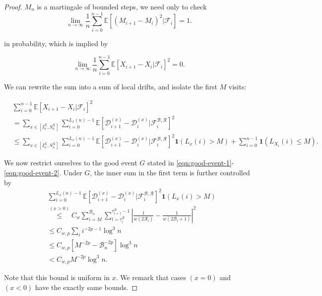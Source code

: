 \begin{proof}
 $M_n$ is a martingale of bounded steps, we need only to check
 \[
	 \lim_{n \to \infty } \frac{1}{n} \sum_{i = 0}^{n-1} \mathbb{E}\left[ (M_{i+1} - M_i)^2 | \mathcal{F}_i \right]  = 1
 .\] 

in probability, which is implied by

\[
	 \lim_{n \to \infty } \frac{1}{n} \sum_{i = 0}^{n-1} \mathbb{E}\left[ X_{i+1} - X_i | \mathcal{F}_i \right]^2 = 0
.\] 

We can rewrite the sum into a sum of local drifts, and isolate the first $M$ visits:

\begin{align}
	&\sum_{i = 0}^{n-1} \mathbb{E}\left[ X_{i+1} - X_i | \mathcal{F}_i \right]^2\\
	&= \sum_{x \in \left[ I_n^X, S_n^X \right]} \sum_{i = 0}^{L_x(n) - 1} \mathbb{E}\left[ \mathcal{D}_{i+1}^{(x)} - \mathcal{D}_i^{(x)} | \mathcal{F}_{i}^{\mathcal{B}, \mathcal{R}} \right]^2  \\
	&\le  \sum_{x \in \left[ I_n^X, S_n^X \right]} \sum_{i = 0}^{L_x(n) - 1} \mathbb{E}\left[ \mathcal{D}_{i+1}^{(x)} - \mathcal{D}_i^{(x)} | \mathcal{F}_{i}^{\mathcal{B}, \mathcal{R}} \right]^2 \mathbf{1}\left( L_x(i) > M \right) + 
	\sum_{i = 0}^{n - 1} \mathbf{1}\left( L_{X_i}(i) \le  M \right) 
	\label{eqn:lem-martingale-1}
.\end{align}

We now restrict ourselves to the good event $G$ stated in \eqref{eqn:good-event-1}-\eqref{eqn:good-event-2}. Under $G$,
the inner sum in the first term is further controlled by
\begin{align*}
	&\sum_{i =0}^{ L_x(n) - 1} \mathbb{E}\left[ \mathcal{D}_{i+1}^{(x)} - \mathcal{D}_i^{(x)} | \mathcal{F}_{i}^{\mathcal{B}, \mathcal{R}} \right]^2 \mathbf{1}\left( L_{x}(i) > M \right) \\
	&\stackrel{(x > 0)}{\le} C_w \sum_{i = M}^{\mathcal{B}_n} \sum_{l = \tau_i^{\mathcal{B}}}^{\tau_{i+1}^{\mathcal{B}}-1} 
	\left| \frac{1}{w(2 \mathcal{R}_l)} - \frac{1}{w\left( 2 \mathcal{B}_l + 1 \right) } \right|^2 \\
	&\le C_{w, p} \sum_i i^{- 2 p - 1} \log^3 n \\
	&\le C_{w, p} \left[ M^{- 2 p} - \mathcal{B}_n^{- 2 p} \right] \log^3 n  \\
	&< C_{w, p} M^{-2 p} \log^3 n
	.
\end{align*}

Note that this bound is uniform in $x$. We remark that cases $(x=0)$ and $(x < 0)$ have the exactly same bounds. 


\end{proof}

